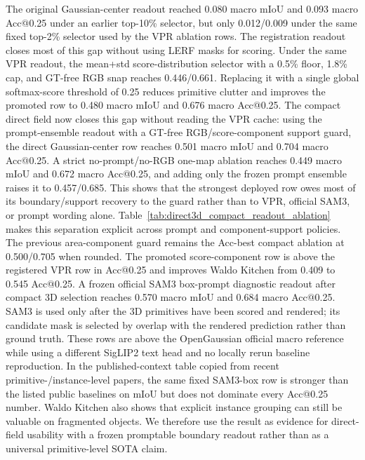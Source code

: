 \documentclass[10pt,twocolumn,letterpaper]{article}
\begin{document}


The original Gaussian-center readout reached 0.080 macro mIoU and 0.093 macro
Acc@0.25 under an earlier top-10\% selector, but only 0.012/0.009 under the same
fixed top-2\% selector used by the VPR ablation rows. The registration readout closes
most of this gap without using LERF masks for scoring. Under the same VPR
readout, the mean+std score-distribution selector with a 0.5\%
floor, 1.8\% cap, and GT-free RGB snap reaches 0.446/0.661. Replacing it with a
single global softmax-score threshold of 0.25 reduces primitive clutter and
improves the promoted row to 0.480 macro mIoU and 0.676 macro Acc@0.25.
The compact direct field now closes this gap without reading the VPR cache:
using the prompt-ensemble readout with a GT-free RGB/score-component support
guard, the direct Gaussian-center row reaches 0.501 macro mIoU and 0.704 macro
Acc@0.25. A strict no-prompt/no-RGB one-map ablation reaches 0.449 macro
mIoU and 0.672 macro Acc@0.25, and adding only the frozen prompt ensemble
raises it to 0.457/0.685. This shows that the strongest deployed row owes most
of its boundary/support recovery to the guard rather than to VPR, official
SAM3, or prompt wording alone.
Table~\ref{tab:direct3d_compact_readout_ablation} makes this separation
explicit across prompt and component-support policies. The
previous area-component guard remains the Acc-best compact ablation at
0.500/0.705 when rounded. The promoted score-component row is above the
registered VPR row in Acc@0.25 and improves Waldo
Kitchen from 0.409 to 0.545 Acc@0.25. A frozen official SAM3 box-prompt
diagnostic readout after compact 3D
selection reaches 0.570 macro mIoU and 0.684 macro Acc@0.25. SAM3 is used only
after the 3D primitives have been scored and rendered; its candidate mask is
selected by overlap with the rendered prediction rather than ground truth. These
rows are above the OpenGaussian official macro reference while using a different
SigLIP2 text head and no locally rerun baseline reproduction. In the
published-context table copied from recent
primitive-/instance-level papers, the same fixed SAM3-box row is stronger than
the listed public baselines on mIoU but does not dominate every Acc@0.25 number.
Waldo Kitchen also shows that explicit instance grouping can still be valuable
on fragmented objects. We therefore use the result as evidence for direct-field
usability with a frozen promptable boundary readout rather than as a universal
primitive-level SOTA claim.


\end{document}
